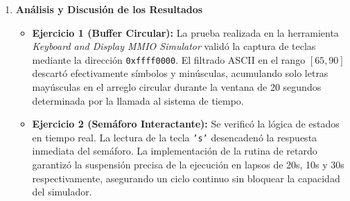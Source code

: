 \documentclass[12pt,letterpaper]{article}
\begin{document}
\begin{enumerate}
\begin{enumerate}[label=\alph*)]
        \item \textbf{Finalización anticipada por software:}
        Si el programa finaliza su ejecución antes de agotarse el tiempo del reloj, debe invocar explícitamente una llamada al sistema (\texttt{syscall} de salida / termina) que deshabilite la alarma programada en el temporizador para evitar interrupciones espurias.
    \end{enumerate}

    \item \textbf{\large\color{UCBlue}Análisis y Discusión de los Resultados}
    
    \vspace{0.2cm}
    \begin{itemize}
        \item \textbf{Ejercicio 1 (Buffer Circular):} La prueba realizada en la herramienta \textit{Keyboard and Display MMIO Simulator} validó la captura de teclas mediante la dirección \texttt{0xffff0000}. El filtrado ASCII en el rango $[65, 90]$ descartó efectivamente símbolos y minúsculas, acumulando solo letras mayúsculas en el arreglo circular durante la ventana de 20 segundos determinada por la llamada al sistema de tiempo.
        \item \textbf{Ejercicio 2 (Semáforo Interactante):} Se verificó la lógica de estados en tiempo real. La lectura de la tecla \texttt{'s'} desencadenó la respuesta inmediata del semáforo. La implementación de la rutina de retardo garantizó la suspensión precisa de la ejecución en lapsos de 20s, 10s y 30s respectivamente, asegurando un ciclo continuo sin bloquear la capacidad del simulador.
    \end{itemize}

\end{enumerate}
\end{document}
